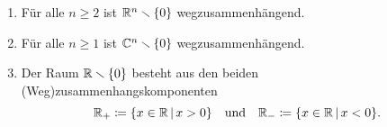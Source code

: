 \section{}





\begin{lemma}
  \label{lemma: path components of punctered euclidian space}
  \begin{enumerate}[label = \alph*)]
    \item
      Für alle $n \geq 2$ ist $\mathbb{R}^n \smallsetminus \{0\}$ wegzusammenhängend.
    \item
      Für alle $n \geq 1$ ist $\mathbb{C}^n \smallsetminus \{0\}$ wegzusammenhängend.
    \item
      Der Raum $\mathbb{R} \smallsetminus \{0\}$ besteht aus den beiden (Weg)zusammenhangskomponenten
      \[
                  \mathbb{R}_+
        \coloneqq \{ x \in \mathbb{R} \,|\, x > 0 \}
        \quad\text{und}\quad
                  \mathbb{R}_-
        \coloneqq \{ x \in \mathbb{R} \,|\, x < 0 \}.
      \]
  \end{enumerate}
\end{lemma}

